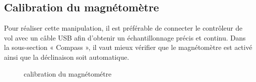 	\subsection{Calibration du magnétomètre}
	Pour réaliser cette manipulation, il est préférable de connecter le contrôleur de vol avec un câble USB afin d’obtenir un échantillonnage précis et continu.
	Dans la sous-section « Compass », il vaut mieux vérifier que le magnétomètre est activé ainsi que la déclinaison soit automatique.
	
	\begin{figure}[h]
		\begin{center}
			\centering
		\end{center}
		\caption{calibration du magnétométre}
	\end{figure}
	

